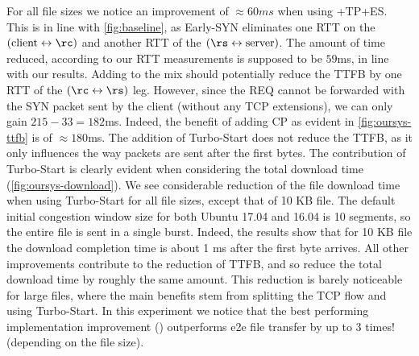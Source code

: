 For all file sizes we notice an improvement of $\approx60ms$ when using \oursys+TP+ES. This is in line with \autoref{fig:baseline}, as Early-SYN eliminates one RTT on the $(\mbox{client}\leftrightarrow\rc)$ and another RTT of the $(\rs\leftrightarrow\mbox{server})$. The amount of time reduced, according to our RTT measurements is supposed to be $59$ms, in line with our results. Adding \reconns to the mix should potentially reduce the TTFB by one RTT of the $(\rc\leftrightarrow\rs)$ leg. However, since the REQ cannot be forwarded with the SYN packet sent by the client (without any TCP extensions), we can only gain $215-33=182$ms. Indeed, the benefit of adding CP as evident in \autoref{fig:oursys-ttfb} is of $\approx 180$ms. The addition of Turbo-Start does not reduce the TTFB, as it only influences the way packets are sent after the first bytes. The contribution of Turbo-Start is clearly evident when considering the total download time (\autoref{fig:oursys-download}). We see considerable reduction of the file download time when using Turbo-Start for all file sizes, except that of 10 KB file. The default initial congestion window size for both Ubuntu 17.04 and 16.04 is 10 segments, so the entire file is sent in a single burst. Indeed, the results show that for 10 KB file the download completion time is about 1 ms after the first byte arrives. All other improvements contribute to the reduction of TTFB, and so reduce the total download time by roughly the same amount. This reduction is barely noticeable for large files, where the main benefits stem from splitting the TCP flow and using Turbo-Start.
In this experiment we notice that the best performing implementation improvement (\ie \oursys) outperforms e2e file transfer by up to 3 times! (depending on the file size).


